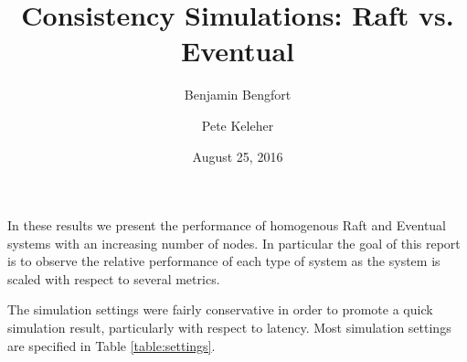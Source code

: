 \documentclass[11pt,letterpaper]{article}
\title{Consistency Simulations: Raft vs. Eventual}
\date{August 25, 2016}
\author[ ]{Benjamin Bengfort}
\author[ ]{Pete Keleher}
\affil[ ]{Department of Computer Science}
\affil[ ]{University of Maryland}
\affil[ ]{\textit{\{bengfort,keleher\}@cs.umd.edu}}
\begin{document}
\maketitle

In these results we present the performance of homogenous Raft and Eventual systems with an increasing number of nodes. In particular the goal of this report is to observe the relative performance of each type of system as the system is scaled with respect to several metrics.

The simulation settings were fairly conservative in order to promote a quick simulation result, particularly with respect to latency. Most simulation settings are specified in Table \ref{table:settings}.

\begin{table}[!h]
\end{table}
\end{document}
